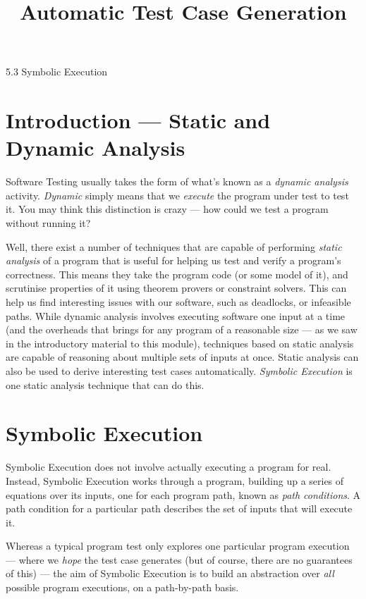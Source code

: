 



\title{Automatic Test Case Generation}{5.3 Symbolic Execution}

\section{Introduction --- Static and Dynamic Analysis}


Software Testing usually takes the form of what's known as a {\it dynamic
analysis} activity. {\it Dynamic} simply means that we {\it execute} the program
under test to test it. You may think this distinction is crazy --- how could we
test a program without running it? 


Well, there exist a number of techniques that are capable of performing {\it
static analysis} of a program that is useful for helping us test and verify a
program's correctness. This means they take the program code (or some model of
it), and scrutinise properties of it using theorem provers or constraint
solvers. This can help us find interesting issues with our software, such as
deadlocks, or infeasible paths. While dynamic analysis involves executing
software one input at a time (and the overheads that brings for any program of a
reasonable size --- as we saw in the introductory material to this module),
techniques based on static analysis are capable of reasoning about multiple sets
of inputs at once. Static analysis can also be used to derive interesting test
cases automatically. {\it Symbolic Execution} is one static analysis technique
that can do this.


\section{Symbolic Execution}

Symbolic Execution does not involve actually executing a program for real.
Instead, Symbolic Execution works through a program, building up a series of
equations over its inputs, one for each program path, known as {\it path
conditions}. A path condition for a particular path describes the set of inputs
that will execute it.

Whereas a typical program test only explores one particular program execution
--- where we {\it hope} the test case generates (but of course, there are no
guarantees of this) --- the aim of Symbolic Execution is to build an abstraction
over {\it all} possible program executions, on a path-by-path basis.

